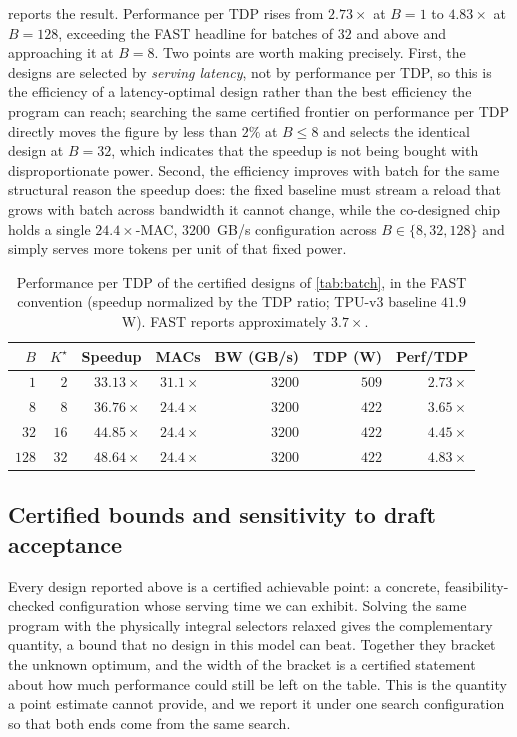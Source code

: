  reports the result. 
Performance per TDP rises from
$2.73\times$ at $B=1$ to $4.83\times$ at $B=128$, exceeding the FAST headline
for batches of $32$ and above and approaching it at $B=8$. Two points are worth
making precisely. First, the designs are selected by \emph{serving latency},
not by performance per TDP, so this is the efficiency of a latency-optimal
design rather than the best efficiency the program can reach; searching the same
certified frontier on performance per TDP directly moves the figure by less than
$2\%$ at $B \le 8$ and selects the identical design at $B=32$, which indicates
that the speedup is not being bought with disproportionate power. Second, the
efficiency improves with batch for the same structural reason the speedup does:
the fixed baseline must stream a reload that grows with batch across bandwidth
it cannot change, while the co-designed chip holds a single $24.4\times$-MAC,
$3200$~GB/s configuration across $B \in \{8, 32, 128\}$ and simply serves more
tokens per unit of that fixed power.

\begin{table}[h]
\centering
\footnotesize
\caption{Performance per TDP of the certified designs of \cref{tab:batch}, in
the FAST convention (speedup normalized by the TDP ratio; TPU-v3 baseline
$41.9$~W). FAST reports approximately $3.7\times$.
}
\label{tab:perftdp}
\begin{tabular}{@{}rrrrrrr@{}}
\toprule
$B$ & $K^\star$ & Speedup & MACs & BW (GB/s) & TDP (W) & Perf/TDP \\
\midrule
$1$   & $2$  & $33.13\times$ & $31.1\times$ & $3200$ & $509$ & $2.73\times$ \\
$8$   & $8$  & $36.76\times$ & $24.4\times$ & $3200$ & $422$ & $3.65\times$ \\
$32$  & $16$ & $44.85\times$ & $24.4\times$ & $3200$ & $422$ & $\mathbf{4.45}\times$ \\
$128$ & $32$ & $48.64\times$ & $24.4\times$ & $3200$ & $422$ & $\mathbf{4.83}\times$ \\
\bottomrule
\end{tabular}
\end{table}

\subsection{Certified bounds and sensitivity to draft acceptance}
\label{sec:certified_gap}

Every design reported above is a certified achievable point: a concrete,
feasibility-checked configuration whose serving time we can exhibit. Solving the
same program with the physically integral selectors relaxed gives the
complementary quantity, a bound that no design in this model can beat. Together
they bracket the unknown optimum, and the width of the bracket is a certified
statement about how much performance could still be left on the table. This is
the quantity a point estimate cannot provide, and we report it under one search
configuration so that both ends come from the same search.

